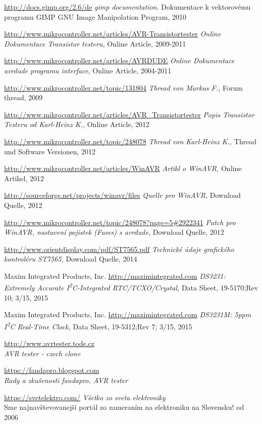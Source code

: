 \documentclass[pdftex,12pt,a4paper,oneside,english]{report}
\begin{document}
\begin{thebibliography}{99}
\url{http://docs.gimp.org/2.6/de}
\emph{gimp documentation}.
Dokumentace k vektorovému programu GIMP GNU Image Manipolation Program,
2010

\url{http://www.mikrocontroller.net/articles/AVR-Transistortester}
\emph{Online Dokumentace Transistor testeru,}
Online Article,
2009-2011

\url{http://www.mikrocontroller.net/articles/AVRDUDE}
\emph{Online Dokumentace avrdude programu interface,}
Online Article,
2004-2011

\url{http://www.mikrocontroller.net/topic/131804}
\emph{Thread von Markus F.,}
Forum thread, 
2009

\url{http://www.mikrocontroller.net/articles/AVR\_Transistortester}
\emph{Popis Transistor Testeru od Karl-Heinz K.,}
Online Article,
2012

\url{http://www.mikrocontroller.net/topic/248078}
\emph{Thread von Karl-Heinz K.,}
Thread und Software Versionen,
2012

\url{http://www.mikrocontroller.net/articles/WinAVR}
\emph{Artikl o WinAVR,}
Online Artikel,
2012

\url{http://sourceforge.net/projects/winavr/files}
\emph{Quelle pro WinAVR,}
Download Quelle,
2012

\url{http://www.mikrocontroller.net/topic/248078?page=5#2922341}
\emph{Patch pro WinAVR, nastavení pojistek (Fuses) s avrdude,}
Download Quelle,
2012

\url{http://www.orientdisplay.com/pdf/ST7565.pdf}
\emph{Technické údaje grafického kontroléru ST7565,}
Download Quelle,
2014

Maxim Integrated Products, Inc.
\url{http://maximintegrated.com}
\emph{DS3231: Extremely Accurate I\textsuperscript{2}C-Integrated RTC/TCXO/Crystal,}
Data Sheet,
19-5170;Rev 10; 3/15,
2015

Maxim Integrated Products, Inc.
\url{http://maximintegrated.com}
\emph{DS3231M: 5ppm I\textsuperscript{2}C Real-Time Clock,}
Data Sheet,
19-5312;Rev 7; 3/15,
2015

\url{http://www.avrtester.tode.cz}\\
\emph{AVR tester - czech clone}

\url{https://fandapro.blogspot.com}\\
\emph{Rady a zkušenosti fandapro, AVR tester}

\url{https://svetelektro.com/}
\emph{Všetko zo sveta elektroniky}
\\
Sme najnavštevovanejší portál zo zameraním na elektroniku na Slovensku!
od 2006

\end{thebibliography}
\end{document}
